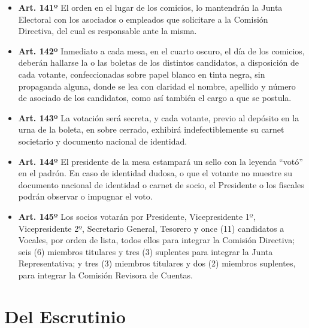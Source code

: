 \documentclass[]{book}
\providecommand{\tightlist}{%
  \setlength{\itemsep}{0pt}\setlength{\parskip}{0pt}}
\begin{document}
\begin{itemize}
\tightlist
\item
  \textbf{Art. 141º}
  El orden en el lugar de los comicios, lo mantendrán la Junta Electoral con los asociados o empleados que solicitare a la Comisión Directiva, del cual es responsable ante la misma.
\end{itemize}

\begin{itemize}
\tightlist
\item
  \textbf{Art. 142º}
  Inmediato a cada mesa, en el cuarto oscuro, el día de los comicios, deberán hallarse la o las boletas de los distintos candidatos, a disposición de cada votante, confeccionadas sobre papel blanco en tinta negra, sin propaganda alguna, donde se lea con claridad el nombre, apellido y número de asociado de los candidatos, como así también el cargo a que se postula.
\end{itemize}

\begin{itemize}
\tightlist
\item
  \textbf{Art. 143º}
  La votación será secreta, y cada votante, previo al depósito en la urna de la boleta, en sobre cerrado, exhibirá indefectiblemente su carnet societario y documento nacional de identidad.
\end{itemize}

\begin{itemize}
\tightlist
\item
  \textbf{Art. 144º}
  El presidente de la mesa estampará un sello con la leyenda ``votó'' en el padrón. En caso de identidad dudosa, o que el votante no muestre su documento nacional de identidad o carnet de socio, el Presidente o los fiscales podrán observar o impugnar el voto.
\end{itemize}

\begin{itemize}
\tightlist
\item
  \textbf{Art. 145º}
  Los socios votarán por Presidente, Vicepresidente 1º, Vicepresidente 2º, Secretario General, Tesorero y once (11) candidatos a Vocales, por orden de lista, todos ellos para integrar la Comisión Directiva; seis (6) miembros titulares y tres (3) suplentes para integrar la Junta Representativa; y tres (3) miembros titulares y dos (2) miembros suplentes, para integrar la Comisión Revisora de Cuentas.
\end{itemize}

\hypertarget{del-escrutinio}{%
\section{Del Escrutinio}\label{del-escrutinio}}
\end{document}
